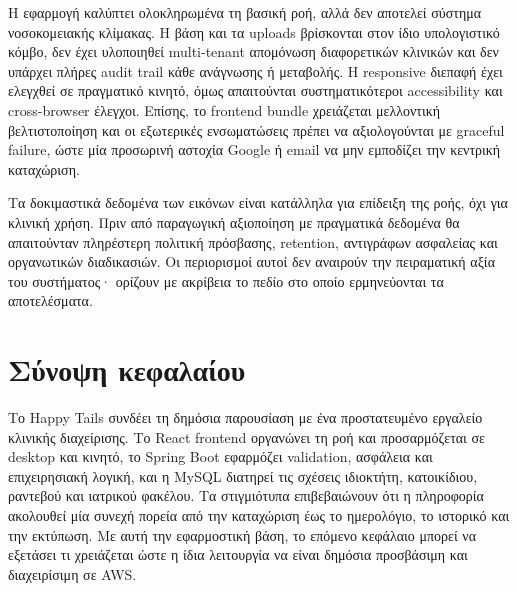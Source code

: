 Η εφαρμογή καλύπτει ολοκληρωμένα τη βασική ροή, αλλά δεν αποτελεί σύστημα
νοσοκομειακής κλίμακας. Η βάση και τα uploads βρίσκονται στον ίδιο
υπολογιστικό κόμβο, δεν έχει υλοποιηθεί multi-tenant απομόνωση διαφορετικών
κλινικών και δεν υπάρχει πλήρες audit trail κάθε ανάγνωσης ή μεταβολής. Η
responsive διεπαφή έχει ελεγχθεί σε πραγματικό κινητό, όμως απαιτούνται
συστηματικότεροι accessibility και cross-browser έλεγχοι. Επίσης, το
frontend bundle χρειάζεται μελλοντική βελτιστοποίηση και οι εξωτερικές
ενσωματώσεις πρέπει να αξιολογούνται με graceful failure, ώστε μία προσωρινή
αστοχία Google ή email να μην εμποδίζει την κεντρική καταχώριση.

Τα δοκιμαστικά δεδομένα των εικόνων είναι κατάλληλα για επίδειξη της ροής,
όχι για κλινική χρήση. Πριν από παραγωγική αξιοποίηση με πραγματικά δεδομένα
θα απαιτούνταν πληρέστερη πολιτική πρόσβασης, retention, αντιγράφων ασφαλείας
και οργανωτικών διαδικασιών. Οι περιορισμοί αυτοί δεν αναιρούν την
πειραματική αξία του συστήματος· ορίζουν με ακρίβεια το πεδίο στο οποίο
ερμηνεύονται τα αποτελέσματα.

\section{Σύνοψη κεφαλαίου}

Το Happy Tails συνδέει τη δημόσια παρουσίαση με ένα προστατευμένο εργαλείο
κλινικής διαχείρισης. Το React frontend οργανώνει τη ροή και προσαρμόζεται σε
desktop και κινητό, το Spring Boot εφαρμόζει validation, ασφάλεια και
επιχειρησιακή λογική, και η MySQL διατηρεί τις σχέσεις ιδιοκτήτη,
κατοικίδιου, ραντεβού και ιατρικού φακέλου. Τα στιγμιότυπα επιβεβαιώνουν ότι
η πληροφορία ακολουθεί μία συνεχή πορεία από την καταχώριση έως το ημερολόγιο,
το ιστορικό και την εκτύπωση. Με αυτή την εφαρμοστική βάση, το επόμενο
κεφάλαιο μπορεί να εξετάσει τι χρειάζεται ώστε η ίδια λειτουργία να είναι
δημόσια προσβάσιμη και διαχειρίσιμη σε AWS.
